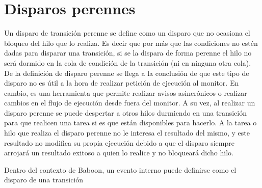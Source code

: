 \section{Disparos perennes}
Un disparo de transición perenne se define como un disparo que no ocasiona el
bloqueo del hilo que lo realiza. Es decir que por más que las condiciones no
estén dadas para disparar una transición, si se la dispara de forma perenne el
hilo no será dormido en la cola de condición de la transición (ni en ninguna
otra cola).
De la definición de disparo perenne se llega a la conclusión de que este
tipo de disparo no es útil a la hora de realizar petición de ejecución al
monitor. En cambio, es una herramienta que permite realizar avisos asincrónicos
o realizar cambios en el flujo de ejecución desde fuera del monitor. A su vez,
al realizar un disparo perenne se puede despertar a otros hilos durmiendo en una
transición para que realicen una tarea si es que están disponibles para
hacerlo. A la tarea o hilo que realiza el disparo perenne no le interesa el
resultado del mismo, y este resultado no modifica su propia ejecución debido a
que el disparo siempre arrojará un resultado exitoso a quien lo realice y no
bloqueará dicho hilo.

Dentro del contexto de Baboon, un evento interno puede definirse como el
disparo de una transición 
